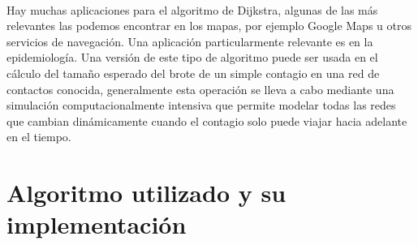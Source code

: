 \documentclass[11pt]{article}
\begin{document}
\paragraph{}
Hay muchas aplicaciones para el algoritmo de Dijkstra, algunas de las más relevantes las podemos encontrar en los mapas, por ejemplo Google Maps u otros servicios de navegación. Una aplicación particularmente relevante es en la epidemiología. Una versión de este tipo de algoritmo puede ser usada en el cálculo del tamaño esperado del brote de un simple contagio en una red de contactos conocida, generalmente esta operación se lleva a cabo mediante una simulación computacionalmente intensiva que permite modelar todas las redes que cambian dinámicamente cuando el contagio solo puede viajar hacia adelante en el tiempo.



\section{Algoritmo utilizado y su implementación }
\end{document}
